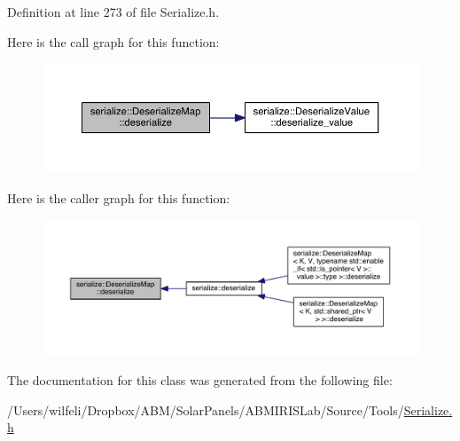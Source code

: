 Definition at line 273 of file Serialize.\+h.



Here is the call graph for this function\+:\nopagebreak
\begin{figure}[H]
\begin{center}
\leavevmode
\includegraphics[width=350pt]{classserialize_1_1_deserialize_map_af4827270beb08c018e840b9cec766cde_cgraph}
\end{center}
\end{figure}




Here is the caller graph for this function\+:
\nopagebreak
\begin{figure}[H]
\begin{center}
\leavevmode
\includegraphics[width=350pt]{classserialize_1_1_deserialize_map_af4827270beb08c018e840b9cec766cde_icgraph}
\end{center}
\end{figure}




The documentation for this class was generated from the following file\+:\begin{DoxyCompactItemize}
\item 
/\+Users/wilfeli/\+Dropbox/\+A\+B\+M/\+Solar\+Panels/\+A\+B\+M\+I\+R\+I\+S\+Lab/\+Source/\+Tools/\hyperlink{_serialize_8h}{Serialize.\+h}\end{DoxyCompactItemize}
